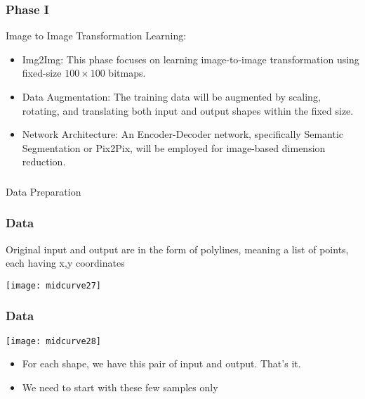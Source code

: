 \begin{frame}[fragile]\frametitle{Phase I}

Image to Image Transformation Learning:

\begin{itemize}
\item Img2Img: This phase focuses on learning image-to-image transformation using fixed-size $100 \times 100$ bitmaps.
\item Data Augmentation: The training data will be augmented by scaling, rotating, and translating both input and output shapes within the fixed size.
\item Network Architecture: An Encoder-Decoder network, specifically Semantic Segmentation or Pix2Pix, will be employed for image-based dimension reduction.
\end{itemize}	

\end{frame}

\begin{frame}[fragile]\frametitle{}
\begin{center}
{\Large Data Preparation}
\end{center}
\end{frame}

\begin{frame}[fragile]\frametitle{Data}

Original input and output are in the form of polylines, meaning a list of points, each having x,y coordinates

\begin{center}
\texttt{[image: midcurve27]}
\end{center}	
\end{frame}

\begin{frame}[fragile]\frametitle{Data}
\begin{center}
\texttt{[image: midcurve28]}
\end{center}

	\begin{itemize}
	\item For each shape, we have this pair of input and output. That's it. 
	\item We need to start with these few samples only
	\end{itemize}
	
\end{frame}

